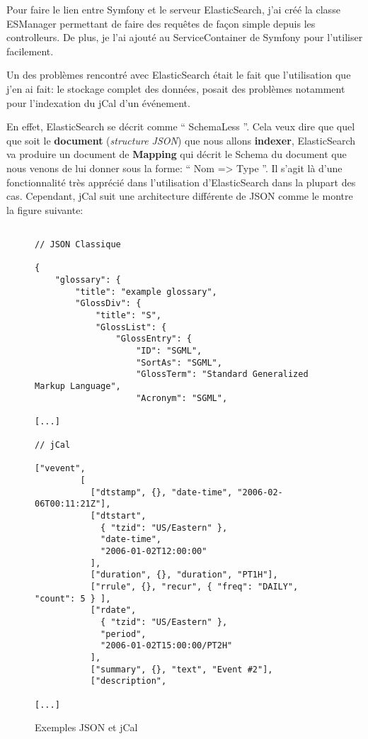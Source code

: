 Pour faire le lien entre Symfony et le serveur ElasticSearch, j'ai créé la classe ESManager permettant de faire des requêtes de façon simple depuis les controlleurs. De plus, je l'ai ajouté au ServiceContainer de Symfony pour l'utiliser facilement.

Un des problèmes rencontré avec ElasticSearch était le fait que l'utilisation que j'en ai fait: le stockage complet des données, posait des problèmes notamment pour l'indexation du jCal d'un événement.

En effet, ElasticSearch se décrit comme `` SchemaLess ''. Cela veux dire que quel que soit le \textbf{document} (\textit{structure JSON}) que nous allons \textbf{indexer}, ElasticSearch va produire un document de \textbf{Mapping} qui décrit le Schema du document que nous venons de lui donner sous la forme: `` Nom => Type ''. Il s'agit là d'une fonctionnalité très apprécié dans l'utilisation d'ElasticSearch dans la plupart des cas. Cependant, jCal suit une architecture différente de JSON comme le montre la figure suivante:

\begin{figure}[h]
\begin{lstlisting}[frame=single]

// JSON Classique

{
    "glossary": {
        "title": "example glossary",
        "GlossDiv": {
            "title": "S",
            "GlossList": {
                "GlossEntry": {
                    "ID": "SGML",
                    "SortAs": "SGML",
                    "GlossTerm": "Standard Generalized Markup Language",
                    "Acronym": "SGML",

[...]

// jCal

["vevent",
         [
           ["dtstamp", {}, "date-time", "2006-02-06T00:11:21Z"],
           ["dtstart",
             { "tzid": "US/Eastern" },
             "date-time",
             "2006-01-02T12:00:00"
           ],
           ["duration", {}, "duration", "PT1H"],
           ["rrule", {}, "recur", { "freq": "DAILY", "count": 5 } ],
           ["rdate",
             { "tzid": "US/Eastern" },
             "period",
             "2006-01-02T15:00:00/PT2H"
           ],
           ["summary", {}, "text", "Event #2"],
           ["description",

[...]

\end{lstlisting}
\caption{Exemples JSON et jCal}
\end{figure}


